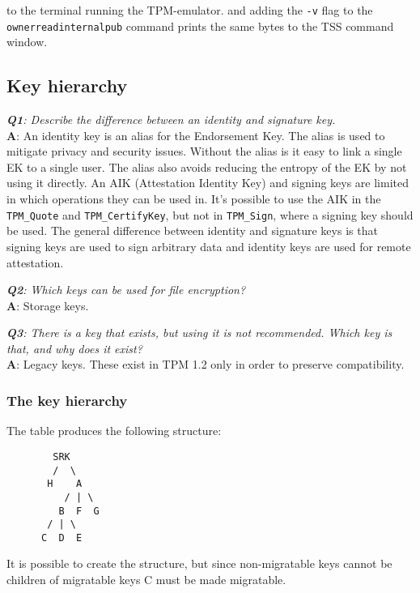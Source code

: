 \documentclass[10pt]{article}
\newcommand{\command}[1]{\texttt{#1}}
\newcommand{\Q}[2]{\textit{\textbf{Q#1}: #2}}
\newcommand{\A}[1]{\textbf{A}: #1}
\begin{document}
      to the terminal running the TPM-emulator.
      and adding the \command{-v} flag to the \\
      \command{ownerreadinternalpub} command
      prints the same bytes to the TSS command window.

  \subsection{Key hierarchy}

    \Q{1}{Describe the difference between an identity and signature key.}\\
    \A{
      An identity key is an alias for the Endorsement Key. The alias is used
      to mitigate privacy and security issues. Without the alias is it easy to
      link a single EK to a single user. The alias also avoids reducing the
      entropy of the EK by not using it directly. An AIK (Attestation Identity
      Key) and signing keys are limited in which operations they can be used
      in. It's possible to use the AIK in the \command{TPM\_Quote} and
      \command{TPM\_CertifyKey}, but not in \command{TPM\_Sign}, where a
      signing key should be used. The general difference between identity and
      signature keys is that signing keys are used to sign arbitrary data and
      identity keys are used for remote attestation.
  }

    \Q{2}{Which keys can be used for file encryption?}\\
    \A{Storage keys.}

    \Q{3}{
      There is a key that exists, but using it is not recommended. Which key
      is that, and why does it exist?
    }\\
    \A{
      Legacy keys. These exist in TPM 1.2 only in order to preserve compatibility.
    }

    \subsubsection{The key hierarchy}

    The table produces the following structure:

\begin{lstlisting}
        SRK
        /  \
       H    A
          / | \
         B  F  G
       / | \
      C  D  E
\end{lstlisting}

    It is possible to create the structure, but since non-migratable keys 
    cannot be children of migratable keys C must be made migratable.
\end{document}

